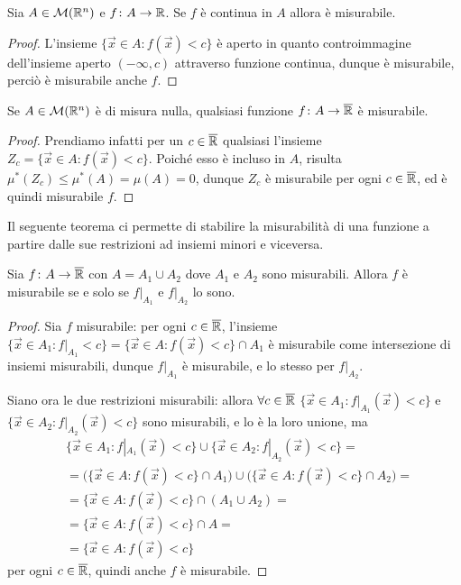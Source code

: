 \begin{teorema} \label{t:funzioni-continue-misurabili}
	Sia $A\in\mathcal M(\mathbb{R}^n)$ e $f\colon A\to\mathbb{R}$.
	Se $f$ è continua in $A$ allora è misurabile.
\end{teorema}
\begin{proof}
	L'insieme $\{\vec x\in A\colon f(\vec x)<c\}$ è aperto in quanto controimmagine dell'insieme aperto $(-\infty,c)$ attraverso funzione continua, dunque è misurabile, perciò è misurabile anche $f$.
\end{proof}
\begin{osservazione} \label{o:funzione-misurabile-su-insieme-nullo}
	Se $A\in\mathcal M(\mathbb{R}^n)$ è di misura nulla, qualsiasi funzione $f\colon A\to\overline{\mathbb{R}}$ è misurabile.
\end{osservazione}
\begin{proof}
	Prendiamo infatti per un $c\in\overline{\mathbb{R}}$ qualsiasi l'insieme $Z_c=\{\vec x\in A\colon f(\vec x)<c\}$.
	Poich\'e esso è incluso in $A$, risulta $\mu^*(Z_c)\leq\mu^*(A)=\mu(A)=0$, dunque $Z_c$ è misurabile per ogni $c\in\overline{\mathbb{R}}$, ed è quindi misurabile $f$.
\end{proof}
Il seguente teorema ci permette di stabilire la misurabilità di una funzione a partire dalle sue restrizioni ad insiemi minori e viceversa.
\begin{teorema} \label{t:funzione-misurabile-restrizioni}
	Sia $f\colon A\to\overline{\mathbb{R}}$ con $A=A_1\cup A_2$ dove $A_1$ e $A_2$ sono misurabili.
	Allora $f$ è misurabile se e solo se $f|_{A_1}$ e $f|_{A_2}$ lo sono.
\end{teorema}
\begin{proof}
	Sia $f$ misurabile: per ogni $c\in\overline{\mathbb{R}}$, l'insieme $\{\vec x\in A_1\colon f|_{A_1}<c\}=\{\vec x\in A\colon f(\vec x)<c\}\cap A_1$ è misurabile come intersezione di insiemi misurabili, dunque $f|_{A_1}$ è misurabile, e lo stesso per $f|_{A_2}$.

	Siano ora le due restrizioni misurabili: allora $\forall c\in\overline{\mathbb{R}}$ $\{\vec x\in A_1\colon f|_{A_1}(\vec x)<c\}$ e $\{\vec x\in A_2\colon f|_{A_2}(\vec x)<c\}$ sono misurabili, e lo è la loro unione, ma
	\begin{equation}
		\begin{aligned}
			&\{\vec x\in A_1\colon f|_{A_1}(\vec x)<c\}\cup\{\vec x\in A_2\colon f|_{A_2}(\vec x)<c\}=\\
			&=\big(\{\vec x\in A\colon f(\vec x)<c\}\cap A_1\big)\cup\big(\{\vec x\in A\colon f(\vec x)<c\}\cap A_2\big)=\\
			&=\{\vec x\in A\colon f(\vec x)<c\}\cap(A_1\cup A_2)=\\
			&=\{\vec x\in A\colon f(\vec x)<c\}\cap A=\\
			&=\{\vec x\in A\colon f(\vec x)<c\}
		\end{aligned}
	\end{equation}
	per ogni $c\in\overline{\mathbb{R}}$, quindi anche $f$ è misurabile.
\end{proof}
